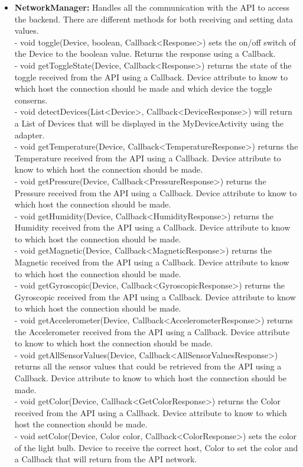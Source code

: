 \documentclass[a4paper]{article}
\begin{document}
\begin{itemize}
		\item{\textbf{NetworkManager:}} 
		Handles all the communication with the API to access the backend. There are different methods for both receiving and setting data values.\\
        - void toggle(Device, boolean, Callback<Response>) sets the on/off switch of the Device to the boolean value. Returns the response using a Callback.\\
        - void getToggleState(Device, Callback<Response>) returns the state of the toggle received from the API using a Callback. Device attribute to know to which host the connection should be made and which device the toggle conserns.\\
        - void detectDevices(List<Device>, Callback<DeviceResponse>) will return a List of Devices that will be displayed in the MyDeviceActivity using the adapter.\\
        - void getTemperature(Device, Callback<TemperatureResponse>) returns the Temperature received from the API using a Callback. Device attribute to know to which host the connection should be made.\\
        - void getPressure(Device, Callback<PressureResponse>) returns the Pressure received from the API using a Callback. Device attribute to know to which host the connection should be made.\\
        - void getHumidity(Device, Callback<HumidityResponse>) 
        returns the Humidity received from the API using a Callback. Device attribute to know to which host the connection should be made.\\
        - void getMagnetic(Device, Callback<MagneticResponse>) returns the Magnetic received from the API using a Callback. Device attribute to know to which host the connection should be made.\\
        - void getGyroscopic(Device, Callback<GyroscopicResponse>) returns the Gyroscopic received from the API using a Callback. Device attribute to know to which host the connection should be made.\\
        - void getAccelerometer(Device, Callback<AccelerometerResponse>) returns the Accelerometer received from the API using a Callback. Device attribute to know to which host the connection should be made.\\
        - void getAllSensorValues(Device, Callback<AllSensorValuesResponse>) returns all the sensor values that could be retrieved from the API using a Callback. Device attribute to know to which host the connection should be made.\\
        - void getColor(Device, Callback<GetColorResponse>) returns the Color received from the API using a Callback. Device attribute to know to which host the connection should be made.\\
        - void setColor(Device, Color color,  Callback<ColorResponse>) sets the color of the light bulb. Device to receive the correct host, Color to set the color and a Callback that will return from the API network.
		
	\end{itemize}
\end{document}

